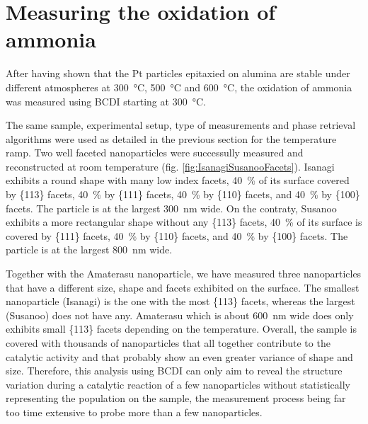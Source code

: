 \section{Measuring the oxidation of ammonia}\label{sec:BCDIAmmoniaOxidation}


After having shown that the Pt particles epitaxied on alumina are stable under different atmospheres at \qty{300}{\degreeCelsius}, \qty{500}{\degreeCelsius} and \qty{600}{\degreeCelsius}, the oxidation of ammonia was measured using BCDI starting at \qty{300}{\degreeCelsius}.

The same sample, experimental setup, type of measurements and phase retrieval algorithms were used as detailed in the previous section for the temperature ramp.
Two well faceted nanoparticles were successully measured and reconstructed at room temperature (fig. \ref{fig:IsanagiSusanooFacets}).
Isanagi exhibits a round shape with many low index facets, \qty{40}{\percent} of its surface covered by \{113\} facets, \qty{40}{\percent} by \{111\} facets, \qty{40}{\percent} by \{110\} facets, and \qty{40}{\percent} by \{100\} facets.
The particle is at the largest \qty{300}{\nm} wide.
On the contraty, Susanoo exhibits a more rectangular shape without any \{113\} facets, \qty{40}{\percent} of its surface is covered by \{111\} facets, \qty{40}{\percent} by \{110\} facets, and \qty{40}{\percent} by \{100\} facets.
The particle is at the largest \qty{800}{\nm} wide.

Together with the Amaterasu nanoparticle, we have measured three nanoparticles that have a different size, shape and facets exhibited on the surface.
The smallest nanoparticle (Isanagi) is the one with the most \{113\} facets, whereas the largest (Susanoo) does not have any.
Amaterasu which is about \qty{600}{\nm} wide does only exhibits small \{113\} facets depending on the temperature.
Overall, the sample is covered with thousands of nanoparticles that all together contribute to the catalytic activity and that probably show an even greater variance of shape and size.
Therefore, this analysis using BCDI can only aim to reveal the structure variation during a catalytic reaction of a few nanoparticles without statistically representing the population on the sample, the measurement process being far too time extensive to probe more than a few nanoparticles.

